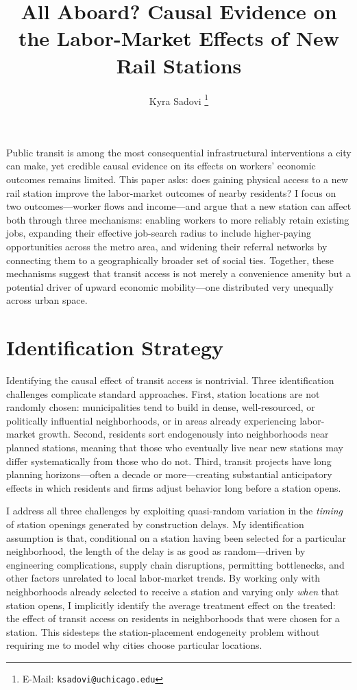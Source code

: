 \documentclass[12pt]{article}
\title{\textbf{All Aboard? Causal Evidence on the Labor-Market Effects of New Rail Stations}}
\author{Kyra Sadovi%
  \thanks{E-Mail: \texttt{ksadovi@uchicago.edu}}}
\affil{Harris School of Public Policy, University of Chicago}
\date{}
\begin{document}
\maketitle
\thispagestyle{empty}

Public transit is among the most consequential infrastructural interventions a city can make, yet credible causal evidence on its effects on workers' economic outcomes remains limited. This paper asks: does gaining physical access to a new rail station improve the labor-market outcomes of nearby residents? I focus on two outcomes---worker flows and income---and argue that a new station can affect both through three mechanisms: enabling workers to more reliably retain existing jobs, expanding their effective job-search radius to include higher-paying opportunities across the metro area, and widening their referral networks by connecting them to a geographically broader set of social ties. Together, these mechanisms suggest that transit access is not merely a convenience amenity but a potential driver of upward economic mobility---one distributed very unequally across urban space.

\section{Identification Strategy}

Identifying the causal effect of transit access is nontrivial. Three identification challenges complicate standard approaches. First, station locations are not randomly chosen: municipalities tend to build in dense, well-resourced, or politically influential neighborhoods, or in areas already experiencing labor-market growth. Second, residents sort endogenously into neighborhoods near planned stations, meaning that those who eventually live near new stations may differ systematically from those who do not. Third, transit projects have long planning horizons---often a decade or more---creating substantial anticipatory effects in which residents and firms adjust behavior long before a station opens.

I address all three challenges by exploiting quasi-random variation in the \textit{timing} of station openings generated by construction delays. My identification assumption is that, conditional on a station having been selected for a particular neighborhood, the length of the delay is as good as random---driven by engineering complications, supply chain disruptions, permitting bottlenecks, and other factors unrelated to local labor-market trends. By working only with neighborhoods already selected to receive a station and varying only \textit{when} that station opens, I implicitly identify the average treatment effect on the treated: the effect of transit access on residents in neighborhoods that were chosen for a station. This sidesteps the station-placement endogeneity problem without requiring me to model why cities choose particular locations.
\end{document}
